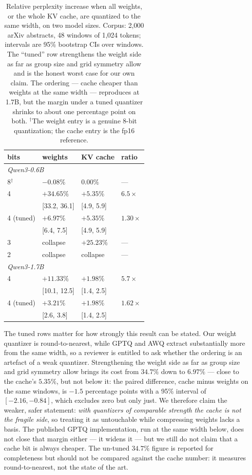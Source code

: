 \documentclass[10pt,journal]{IEEEtran}
\begin{document}
\begin{table}[t]
\centering
\caption{Relative perplexity increase when all weights, or the whole KV cache,
are quantized to the same width, on two model sizes. Corpus: 2{,}000 arXiv
abstracts, 48 windows of 1{,}024 tokens; intervals are 95\% bootstrap CIs over
windows. The ``tuned'' row strengthens the weight side as far as group size and
grid symmetry allow and is the honest worst case for our own claim. The
ordering --- cache cheaper than weights at the same width --- reproduces at
1.7B, but the margin under a tuned quantizer shrinks to about one percentage
point on both. $^{\dagger}$The weight entry is a genuine 8-bit
quantization; the cache entry is the fp16 reference.}
\label{tab:bitcost}
\begin{tabular}{llll}
\toprule
bits & weights & KV cache & ratio \\
\midrule
\multicolumn{4}{l}{\emph{Qwen3-0.6B}}\\
8$^{\dagger}$ & $-0.08\%$ & $0.00\%$ & --- \\
4 & $+34.65\%$ & $+5.35\%$ & $6.5\times$ \\
  & {\small[33.2, 36.1]} & {\small[4.9, 5.9]} & \\
4 (tuned) & $+6.97\%$ & $+5.35\%$ & $1.30\times$ \\
  & {\small[6.4, 7.5]} & {\small[4.9, 5.9]} & \\
3 & collapse & $+25.23\%$ & --- \\
2 & collapse & collapse & --- \\
\midrule
\multicolumn{4}{l}{\emph{Qwen3-1.7B}}\\
4 & $+11.33\%$ & $+1.98\%$ & $5.7\times$ \\
  & {\small[10.1, 12.5]} & {\small[1.4, 2.5]} & \\
4 (tuned) & $+3.21\%$ & $+1.98\%$ & $1.62\times$ \\
  & {\small[2.6, 3.8]} & {\small[1.4, 2.5]} & \\
\bottomrule
\end{tabular}
\end{table}

The tuned rows matter for how strongly this result can be stated. Our weight
quantizer is round-to-nearest, while GPTQ and AWQ extract substantially more from
the same width, so a reviewer is entitled to ask whether the ordering is an
artefact of a weak quantizer. Strengthening the weight side as far as group size
and grid symmetry allow brings its cost from $34.7\%$ down to $6.97\%$ --- close
to the cache's $5.35\%$, but not below it: the paired difference, cache minus
weights on the same windows, is $-1.5$ percentage points with a 95\% interval of
$[-2.16, -0.84]$, which excludes zero but only just. We therefore claim the
weaker, safer statement: \emph{with quantizers of comparable strength the cache
is not the fragile side}, so treating it as untouchable while compressing weights
lacks a basis. The published GPTQ implementation, run at the same width
below, does not close that margin either --- it widens it --- but we still do not
claim that a cache bit is always cheaper. The
un-tuned $34.7\%$ figure is reported for completeness but should not be compared
against the cache number: it measures round-to-nearest, not the state of the art.
\end{document}
